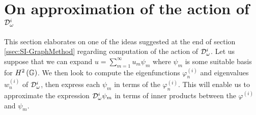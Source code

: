 \section{On approximation of the action of $\mathcal{D}^i_\omega$} \label{sec:SIApp-NonLocalSolve}
This section elaborates on one of the ideas suggested at the end of section \ref{ssec:SI-GraphMethod} regarding computation of the action of $\mathcal{D}_\omega^i$.
Let us suppose that we can expand $u=\sum_{m=1}^{\infty}u_m\psi_m$ where $\psi_m$ is some suitable basis for $H^2\left( \mathbb{G} \right)$.
We then look to compute the eigenfunctions $\varphi^{(i)}_n$ and eigenvalues $w^{(i)}_n$ of $\mathcal{D}_{\omega}^i$, then express each $\psi_m$ in terms of the $\varphi^{(i)}_n$.
This will enable us to approximate the expression $\mathcal{D}^i_\omega\psi_m$ in terms of inner products between the $\varphi^{(i)}$ and $\psi_m$.

